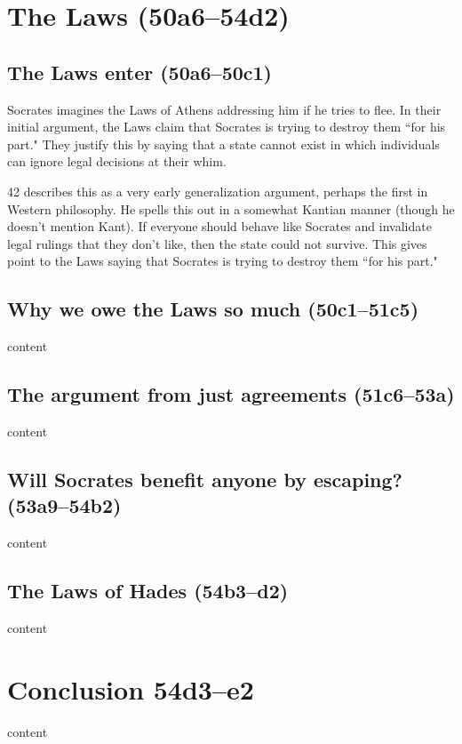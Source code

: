 \documentclass[11pt]{article}
\begin{document}
\section{The Laws (50a6--54d2)}

\subsection{The Laws enter (50a6--50c1)}

Socrates imagines the Laws of Athens addressing him if he tries to flee.  In their initial argument, the Laws claim that Socrates is trying to destroy them ``for his part."  They justify this by saying that a state cannot exist in which individuals can ignore legal decisions at their whim.

\citet{kraut1984} 42 describes this as a very early generalization argument, perhaps the first in Western philosophy.  He spells this out in a somewhat Kantian manner (though he doesn't mention Kant).  If everyone should behave like Socrates and invalidate legal rulings that they don't like, then the state could not survive.  This gives point to the Laws saying that Socrates is trying to destroy them ``for his part."

\subsection{Why we owe the Laws so much (50c1--51c5)}

content

\subsection{The argument from just agreements (51c6--53a)}

content

\subsection{Will Socrates benefit anyone by escaping? (53a9--54b2)}

content

\subsection{The Laws of Hades (54b3--d2)}

content


\section{Conclusion 54d3--e2}

content

\newpage


\end{document}
